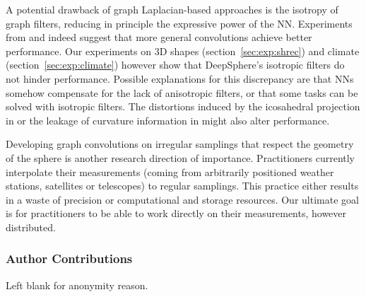 \documentclass{article} %
\newcommand{\todo}[1]{{\color[rgb]{.6,.1,.6}{#1}}}
\newcommand{\secref}[1]{section~\ref{sec:#1}}
\begin{document}
A potential drawback of graph Laplacian-based approaches is the isotropy of graph filters, reducing in principle the expressive power of the NN.
Experiments from \citet{cohen2019gauge} and \citet{boscaini2016anisotropicgraphnn} indeed suggest that more general convolutions achieve better performance.
Our experiments on 3D shapes (\secref{exp:shrec}) and climate (\secref{exp:climate}) however show that DeepSphere's isotropic filters do not hinder performance.
Possible explanations for this discrepancy are that NNs somehow compensate for the lack of anisotropic filters, or that some tasks can be solved with isotropic filters.
The distortions induced by the icosahedral projection in \citet{cohen2019gauge} or the leakage of curvature information in \citet{boscaini2016anisotropicgraphnn} might also alter performance.

Developing graph convolutions on irregular samplings that respect the geometry of the sphere is another research direction of importance.
Practitioners currently interpolate their measurements (coming from arbitrarily positioned weather stations, satellites or telescopes) to regular samplings.
This practice either results in a waste of precision or computational and storage resources.
Our ultimate goal is for practitioners to be able to work directly on their measurements, however distributed.



\newpage
\subsubsection*{Author Contributions}
Left blank for anonymity reason.
\end{document}
